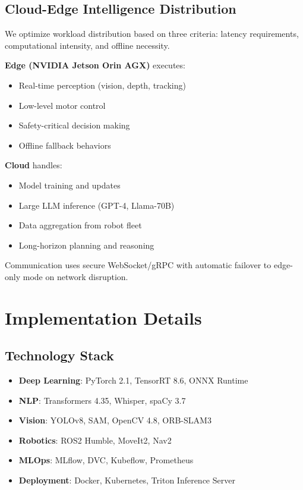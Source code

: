 \documentclass[conference]{IEEEtran}
\begin{document}
\subsection{Cloud-Edge Intelligence Distribution}

We optimize workload distribution based on three criteria: latency requirements, computational intensity, and offline necessity.

\textbf{Edge (NVIDIA Jetson Orin AGX)} executes:
\begin{itemize}
    \item Real-time perception (vision, depth, tracking)
    \item Low-level motor control
    \item Safety-critical decision making
    \item Offline fallback behaviors
\end{itemize}

\textbf{Cloud} handles:
\begin{itemize}
    \item Model training and updates
    \item Large LLM inference (GPT-4, Llama-70B)
    \item Data aggregation from robot fleet
    \item Long-horizon planning and reasoning
\end{itemize}

Communication uses secure WebSocket/gRPC with automatic failover to edge-only mode on network disruption.

\section{Implementation Details}
\label{sec:implementation}

\subsection{Technology Stack}

\begin{itemize}
    \item \textbf{Deep Learning}: PyTorch 2.1, TensorRT 8.6, ONNX Runtime
    \item \textbf{NLP}: Transformers 4.35, Whisper, spaCy 3.7
    \item \textbf{Vision}: YOLOv8, SAM, OpenCV 4.8, ORB-SLAM3
    \item \textbf{Robotics}: ROS2 Humble, MoveIt2, Nav2
    \item \textbf{MLOps}: MLflow, DVC, Kubeflow, Prometheus
    \item \textbf{Deployment}: Docker, Kubernetes, Triton Inference Server
\end{itemize}
\end{document}
